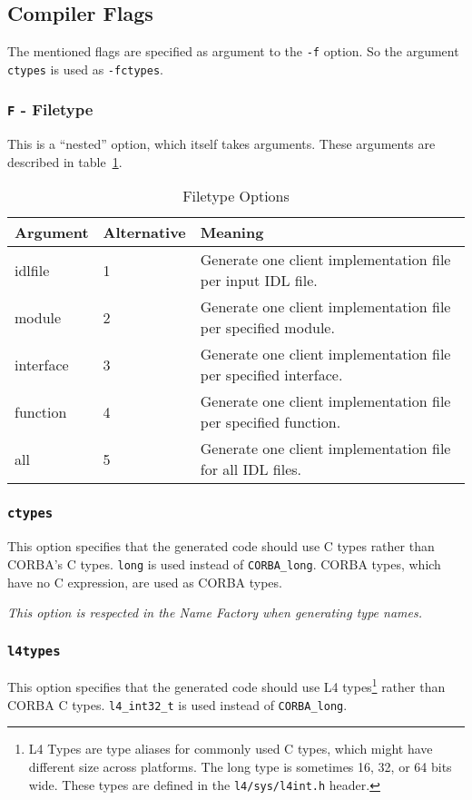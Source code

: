 \subsection{Compiler Flags}
\label{sec:comp-flags}
The mentioned flags are specified as argument to the {\tt -f} option.
So the argument {\tt ctypes} is used as {\tt -fctypes}.

\subsubsection{{\tt F} - Filetype}
This is a ``nested'' option, which itself takes arguments. These arguments
are described in table~\ref{tab:filetype}.

\begin{table}[htb]
\begin{center}
\begin{tabular}{|l|l|p{6cm}|} \hline
Argument & Alternative & Meaning \\ \hline \hline
idlfile & 1 & Generate one client implementation file per input IDL file. \\ \hline
module & 2 & Generate one client implementation file per specified module. \\ \hline
interface & 3 & Generate one client implementation file per specified interface. \\ \hline
function & 4 & Generate one client implementation file per specified function. \\ \hline
all & 5 & Generate one client implementation file for all IDL files. \\ \hline
\end{tabular}
\caption{\label{tab:filetype} Filetype Options}
\end{center}
\end{table}

\subsubsection{{\tt ctypes}}
This option specifies that the generated code should use C types rather than
CORBA's C types. \verb|long| is used instead of \verb|CORBA_long|.
CORBA types, which have no C expression, are used as CORBA types.

{\it This option is respected in the Name Factory when generating type names.}

\subsubsection{{\tt l4types}}
This option specifies that the generated code should use L4 types\footnote{L4 Types
are type aliases for commonly used C types, which might have different size across
platforms. The long type is sometimes 16, 32, or 64 bits wide. These types are defined
in the {\tt l4/sys/l4int.h} header.} rather than
CORBA C types. \verb|l4_int32_t| is used instead of \verb|CORBA_long|.

